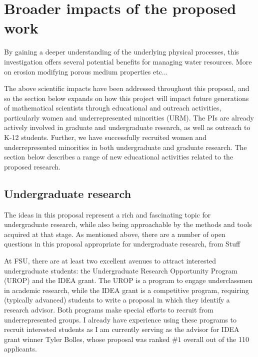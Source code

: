 \documentclass[11pt]{article}
\newcommand{\nick}[1]{{\color{red}#1}}
\begin{document}
\section{Broader impacts of the proposed work}

By gaining a deeper understanding of the underlying physical processes, this investigation offers several potential benefits for managing water resources.
\nick{More on erosion modifying porous medium properties etc...}

The above scientific impacts have been addressed throughout this proposal, and so the section below expands on how this project will impact future generations of mathematical scientists through educational and outreach activities, particularly women and underrepresented minorities (URM). 
The PIs are already actively involved in graduate and undergraduate research, as well as outreach to K-12 students. Further, we have successfully recruited women and underrepresented minorities in both undergraduate and graduate research. The section below describes a range of new educational activities related to the proposed research.


\subsection{Undergraduate research}
The ideas in this proposal represent a rich and fascinating topic for undergraduate research, while also being approachable by the methods and tools acquired at that stage. As mentioned above, there are a number of open questions in this proposal appropriate for undergraduate research, from {\color{blue} Stuff}
	
At FSU, there are at least two excellent avenues to attract interested undergraduate students:  the Undergraduate Research Opportunity Program (UROP) and the IDEA grant. The UROP is a program to engage underclassmen in academic research, while the IDEA grant is a competitive program, requiring (typically advanced) students to write a proposal in which they identify a research advisor. Both programs make special efforts to recruit from underrepresented groups. I already have experience using these programs to recruit interested students as I am currently serving as the advisor for IDEA grant winner Tyler Bolles, whose proposal was ranked $\#1$ overall out of the 110 applicants.
\end{document}
